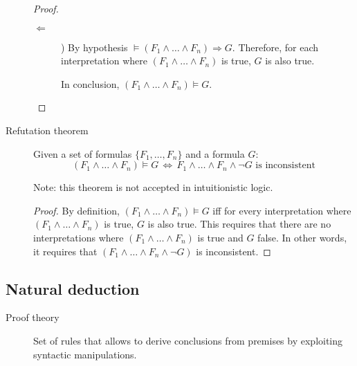 \begin{description}
\begin{proof}
\begin{description}
                \item[$\Leftarrow$]) 
                    By hypothesis $\models (F_1 \land \dots \land F_n) \Rightarrow G$.
                    Therefore, for each interpretation where $(F_1 \land \dots \land F_n)$ is true,
                    $G$ is also true.
        
                    In conclusion, $(F_1 \land \dots \land F_n) \models G$.
            \end{description}
        \end{proof}

    \item[Refutation theorem] 
        Given a set of formulas $\{ F_1, \dots, F_n \}$ and a formula $G$:
        \[ (F_1 \land \dots \land F_n) \models G \,\iff\, F_1 \land \dots \land F_n \land \lnot G \text{ is inconsistent} \]
        
        Note: this theorem is not accepted in intuitionistic logic.
        
        \begin{proof}
            By definition, $(F_1 \land \dots \land F_n) \models G$ iff for every interpretation where 
            $(F_1 \land \dots \land F_n)$ is true, $G$ is also true.
            This requires that there are no interpretations where $(F_1 \land \dots \land F_n)$ is true and $G$ false.
            In other words, it requires that $(F_1 \land \dots \land F_n \land \lnot G)$ is inconsistent.
        \end{proof}
\end{description}




\subsection{Natural deduction}
\begin{description}
    \item[Proof theory] 
        Set of rules that allows to derive conclusions from premises by exploiting syntactic manipulations.
\end{description}

